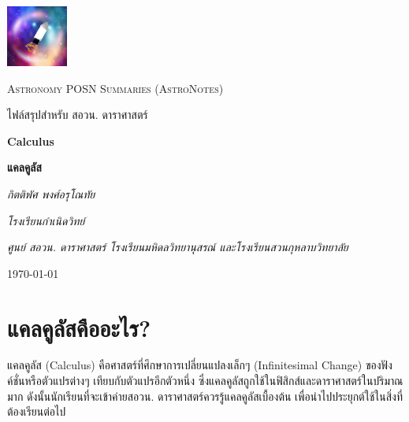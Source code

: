 \documentclass[12pt, a4paper, oneside]{article}
\begin{document}
\pagestyle{fancy}
\fancyhf{}
\cfoot{\thepage}

\begin{titlepage}
	\centering
    
    \includegraphics[width=0.15\textwidth]{img/mzpfp2.jpg}
    \par\vspace{1cm}
	{\Large \textsc{Astronomy POSN Summaries (AstroNotes)}\par}
    \vspace{0.25cm}
	{\Large \textsc{ไฟล์สรุปสำหรับ สอวน. ดาราศาสตร์}\par}

	\vspace{2cm}
	{\LARGE\bfseries Calculus\par}
    \vspace{0.25cm}
    {\LARGE\bfseries แคลคูลัส\par}

	\vspace{1cm}
	{\Large\itshape กิตติพัศ พงศ์อรุโณทัย\par}
    \vspace{0.25cm}
    {\large\itshape โรงเรียนกำเนิดวิทย์\par}
    {\itshape ศูนย์ สอวน. ดาราศาสตร์ โรงเรียนมหิดลวิทยานุสรณ์ และโรงเรียนสวนกุหลาบวิทยาลัย}
	\vfill
	{\large \today\par}
\end{titlepage}

\section{แคลคูลัสคืออะไร?}
แคลคูลัส (Calculus) คือศาสตร์ที่ศึกษาการเปลี่ยนแปลงเล็กๆ (Infinitesimal Change) ของฟังค์ชั่นหรือตัวแปรต่างๆ เทียบกับตัวแปรอีกตัวหนึ่ง  ซึ่งแคลคูลัสถูกใช้ในฟิสิกส์และดาราศาสตร์ในปริมาณมาก ดังนั้นนักเรียนที่จะเข้าค่ายสอวน. ดาราศาสตร์ควรรู้แคลคูลัสเบื้องต้น เพื่อนำไปประยุกต์ใช้ในสิ่งที่ต้องเรียนต่อไป
\end{document}
